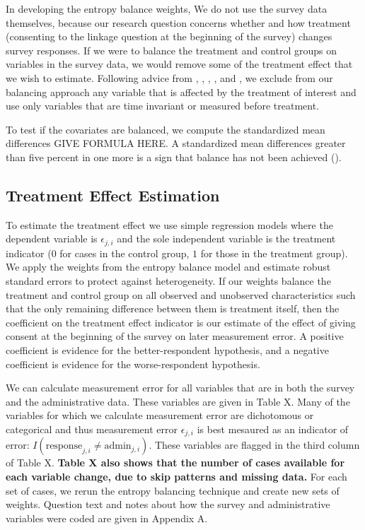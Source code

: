 In developing the entropy balance weights, We do not use the survey data themselves, because our research question concerns whether and how treatment (consenting to the linkage question at the beginning of the survey) changes survey responses. If we were to balance the treatment and control groups on variables in the survey data, we would remove some of the treatment effect that we wish to estimate. Following advice from \cite{Rosenbaum84}, \cite{Frangakisetal02}, \cite{Greenland03}, \cite{Caliendoetal08}, and \cite{Stuart10}, we exclude from our balancing approach any variable that is affected by the treatment of interest and use only variables that are time invariant or measured before treatment. 



To test if the covariates are balanced, we compute the standardized mean differences GIVE FORMULA HERE. A standardized mean differences greater than five percent in one more is a sign that balance has not been achieved (\cite{Caliendoetal08}). 

\subsection{Treatment Effect Estimation}

To estimate the treatment effect we use simple regression models where the dependent variable is $\epsilon_{j,i}$ and the sole independent variable is the treatment indicator ($0$ for cases in the control group, $1$ for those in the treatment group). We apply the weights from the entropy balance model and estimate robust standard errors to protect against heterogeneity. If our weights balance the treatment and control group on all observed and unobserved characteristics such that the only remaining difference between them is treatment itself, then the coefficient on the treatment effect indicator is our estimate of the effect of giving consent at the beginning of the survey on later measurement error. A positive coefficient is evidence for the better-respondent hypothesis, and a negative coefficient is evidence for the worse-respondent hypothesis.

We can calculate measurement error for all variables that are in both the survey and the administrative data. These variables are given in Table X.  Many of the variables for which we calculate measurement error are dichotomous or categorical and thus measurement error $\epsilon_{j,i}$ is best mesaured as an indicator of error: $I(\text{response}_{j,i} \neq \text{admin}_{j,i})$. These variables are flagged in the third column of Table X. \textbf{Table X also shows that the number of cases available for each variable change, due to skip patterns and missing data.} For each set of cases, we rerun the entropy balancing technique and create new sets of weights. Question text and notes about how the survey and administrative variables were coded are given in Appendix A.


